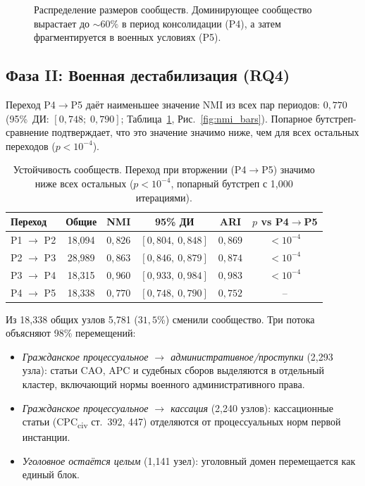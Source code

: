 \documentclass[11pt]{article}
\begin{document}
\begin{figure}[t]
\centering

\caption{Распределение размеров сообществ. Доминирующее сообщество вырастает до ${\sim}60\%$ в период консолидации (P4), а затем фрагментируется в военных условиях (P5).}
\label{fig:comm_sizes}
\end{figure}

\subsection{Фаза II: Военная дестабилизация (RQ4)}

\begin{sloppypar}
Переход P4$\to$P5 даёт наименьшее значение NMI из всех пар периодов: $0{,}770$ (95\%~ДИ: $[0{,}748;\; 0{,}790]$; Таблица~\ref{tab:nmi}, Рис.~\ref{fig:nmi_bars}).
Попарное бутстреп-сравнение подтверждает, что это значение значимо ниже, чем для всех остальных переходов ($p < 10^{-4}$).
\end{sloppypar}

\begin{table}[t]
\centering
\small
\caption{Устойчивость сообществ. Переход при вторжении (P4$\to$P5) значимо ниже всех остальных ($p < 10^{-4}$, попарный бутстреп с 1{,}000 итерациями).}
\label{tab:nmi}
\begin{tabular}{@{}lccccc@{}}
\toprule
\textbf{Переход} & \textbf{Общие} & \textbf{NMI} & \textbf{95\% ДИ} & \textbf{ARI} & $p$ \textbf{vs P4$\to$P5} \\
\midrule
P1 $\to$ P2 & 18{,}094 & $0{,}826$ & $[0{,}804,\ 0{,}848]$ & $0{,}869$ & $< 10^{-4}$ \\
P2 $\to$ P3 & 28{,}989 & $0{,}863$ & $[0{,}846,\ 0{,}879]$ & $0{,}874$ & $< 10^{-4}$ \\
P3 $\to$ P4 & 18{,}315 & $0{,}960$ & $[0{,}933,\ 0{,}984]$ & $0{,}983$ & $< 10^{-4}$ \\
P4 $\to$ P5 & 18{,}338 & $0{,}770$ & $[0{,}748,\ 0{,}790]$ & $0{,}752$ & -- \\
\bottomrule
\end{tabular}
\end{table}

Из 18{,}338 общих узлов 5{,}781 ($31{,}5$\%) сменили сообщество.
Три потока объясняют 98\% перемещений:
\begin{itemize}[nosep]
  \item \emph{Гражданское процессуальное $\to$ административное/проступки} (2{,}293 узла): статьи CAO, APC и судебных сборов выделяются в отдельный кластер, включающий нормы военного административного права.
  \item \emph{Гражданское процессуальное $\to$ кассация} (2{,}240 узлов): кассационные статьи (CPC\textsubscript{civ} ст.~392, 447) отделяются от процессуальных норм первой инстанции.
  \item \emph{Уголовное остаётся целым} (1{,}141 узел): уголовный домен перемещается как единый блок.
\end{itemize}
\end{document}
